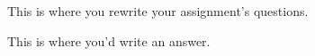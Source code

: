 \documentclass[11pt,twocolumn]{article}
\begin{document}
\begin{question}
  This is where you rewrite your assignment's questions.
\end{question}

\begin{answer}
  This is where you'd write an answer.
\end{answer}

\end{document}
